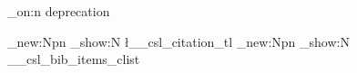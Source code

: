 \usepackage[enable-debug,check-declarations]{expl3}

\ExplSyntaxOn
\debug_on:n { deprecation }

\cs_new:Npn \showcitation
  { \tl_show:N \l__csl_citation_tl }
\cs_new:Npn \showbibliography
  { \clist_show:N \g__csl_bib_items_clist }

\ExplSyntaxOff
